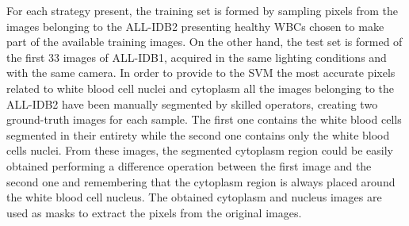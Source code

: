 \documentclass[final,a4paper,12pt,english]{UnicaPhdThesis3}
\begin{document}
	
	For each strategy present, the training set is formed by sampling pixels from the images belonging to the ALL-IDB2 presenting healthy WBCs chosen to make part of the available training images. On the other hand, the test set is formed of the first 33 images of ALL-IDB1, acquired in the same lighting conditions and with the same camera. In order to provide to the SVM the most accurate pixels related to white blood cell nuclei and cytoplasm all the images belonging to the ALL-IDB2 have been manually segmented by skilled operators, creating two ground-truth images for each sample. The first one contains the white blood cells segmented in their entirety while the second one contains only the white blood cells nuclei. From these images, the segmented cytoplasm region could be easily obtained performing a difference operation between the first image and the second one and remembering that the cytoplasm region is always placed around the white blood cell nucleus. The obtained cytoplasm and nucleus images are used as masks to extract the pixels from the original images. 
	
\end{document}
